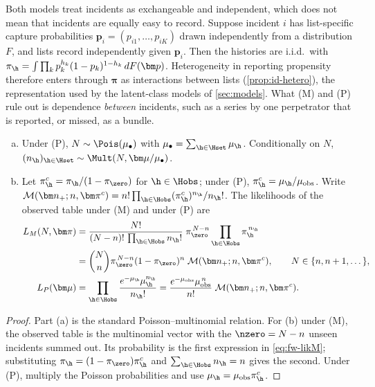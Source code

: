 Both models treat incidents as exchangeable and independent, which does not mean that incidents are equally easy to record. Suppose incident $i$ has list-specific capture probabilities $\bm p_i=(p_{i1},\dots,p_{iK})$ drawn independently from a distribution $F$, and lists record independently given $\bm p_i$. Then the histories are i.i.d.\ with $\pi_{\h}=\int\prod_k p_k^{h_k}(1-p_k)^{1-h_k}\,dF(\bm p)$. Heterogeneity in reporting propensity therefore enters through $\bm\pi$ as interactions between lists (\cref{prop:id-hetero}), the representation used by the latent-class models of \cref{sec:models}. What (M) and (P) rule out is dependence \emph{between} incidents, such as a series by one perpetrator that is reported, or missed, as a bundle.

\begin{lemma}\label{lem:fw-factor}
\leavevmode
\begin{enumerate}[(a)]
  \item Under (P), $N\sim\Pois(\mu_\bullet)$ with $\mu_\bullet=\sum_{\h\in\Hset}\mu_{\h}$. Conditionally on $N$, $(n_{\h})_{\h\in\Hset}\sim\Mult(N,\bm\mu/\mu_\bullet)$.
  \item Let $\pi^c_{\h}=\pi_{\h}/(1-\pi_{\zero})$ for $\h\in\Hobs$; under (P), $\pi^c_{\h}=\mu_{\h}/\mu_{\mathrm{obs}}$. Write $\mathcal M(\bm n_+;n,\bm\pi^c)=n!\prod_{\h\in\Hobs}(\pi^c_{\h})^{n_{\h}}/n_{\h}!$. The likelihoods of the observed table under (M) and under (P) are
  \begin{align}
    L_M(N,\bm\pi)
      &=\frac{N!}{(N-n)!\,\prod_{\h\in\Hobs}n_{\h}!}\;\pi_{\zero}^{\,N-n}\prod_{\h\in\Hobs}\pi_{\h}^{\,n_{\h}}\notag\\
      &=\binom{N}{n}\pi_{\zero}^{\,N-n}(1-\pi_{\zero})^{n}\;\mathcal M(\bm n_+;n,\bm\pi^c),\qquad N\in\{n,n+1,\dots\},\label{eq:fw-likM}\\
    L_P(\bm\mu)
      &=\prod_{\h\in\Hobs}\frac{e^{-\mu_{\h}}\mu_{\h}^{n_{\h}}}{n_{\h}!}
       =\frac{e^{-\mu_{\mathrm{obs}}}\mu_{\mathrm{obs}}^{\,n}}{n!}\;\mathcal M(\bm n_+;n,\bm\pi^c).\label{eq:fw-likP}
  \end{align}
\end{enumerate}
\end{lemma}

\begin{proof}
Part (a) is the standard Poisson--multinomial relation. For (b) under (M), the observed table is the multinomial vector with the $\nzero=N-n$ unseen incidents summed out. Its probability is the first expression in \eqref{eq:fw-likM}; substituting $\pi_{\h}=(1-\pi_{\zero})\pi^c_{\h}$ and $\sum_{\h\in\Hobs}n_{\h}=n$ gives the second. Under (P), multiply the Poisson probabilities and use $\mu_{\h}=\mu_{\mathrm{obs}}\pi^c_{\h}$.
\end{proof}

